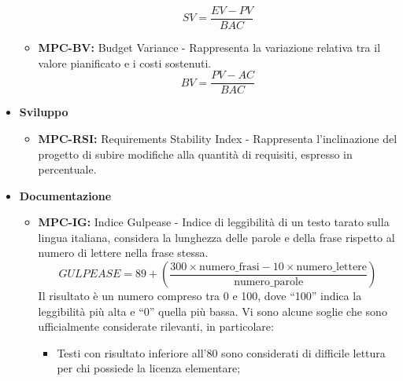 \documentclass[8pt]{article}
\begin{document}
\begin{itemize}
\begin{itemize}
                \begin{equation}
                SV = \frac{EV - PV}{BAC}
                \end{equation}
            \item \textbf{MPC-BV:} Budget Variance - Rappresenta la variazione relativa tra il valore pianificato e i costi sostenuti.
                \begin{equation}
                BV = \frac{PV - AC}{BAC}
                \end{equation}
        \end{itemize}        
       \clearpage
    \item \textbf{Sviluppo}
        \begin{itemize}
            \item \textbf{MPC-RSI:} Requirements Stability Index - Rappresenta l'inclinazione del progetto di subire modifiche alla quantità di requisiti, espresso in percentuale.
        \end{itemize}
   \item \textbf{Documentazione}
        \begin{itemize}
            \item \textbf{MPC-IG:} Indice Gulpease - Indice di leggibilità di un testo tarato sulla
                lingua italiana, considera la lunghezza delle parole e della frase rispetto al
                numero di lettere nella frase stessa.
                \begin{equation}
                GULPEASE = 89 + \left(\frac{{300 \times \text{numero\_frasi} - 10 \times \text{numero\_lettere}}}{{\text{numero\_parole}}}\right)
                \end{equation}
                Il risultato è un numero compreso tra 0 e 100, dove ``100'' indica la leggibilità più alta e ``0'' quella più bassa. Vi sono alcune soglie che sono ufficialmente considerate rilevanti, in particolare:
                \begin{itemize}
                    \item Testi con risultato inferiore all'80 sono considerati di difficile lettura per chi possiede la licenza elementare;

\end{itemize}
\end{itemize}
\end{itemize}
\end{document}
